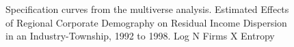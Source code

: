 \documentclass{article}
\begin{document}
\begin{figure}[htbp]
  \centering
  \caption{Specification curves from the multiverse analysis. Estimated Effects of Regional Corporate Demography on Residual Income Dispersion in an Industry-Township, 1992 to 1998.  Log N Firms X Entropy}
  \label{fig:gross_income}
  
\end{figure}


\end{document}
